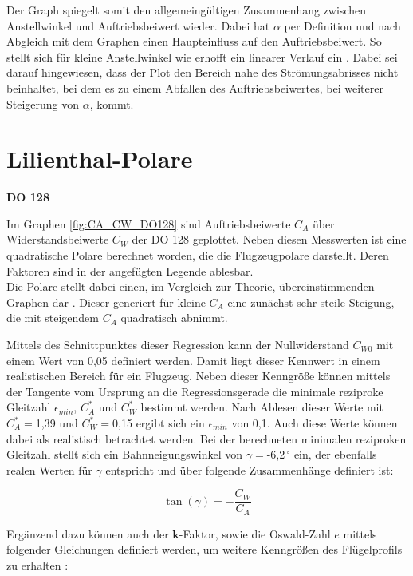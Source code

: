 Der Graph spiegelt somit den allgemeingültigen Zusammenhang zwischen Anstellwinkel und Auftriebsbeiwert wieder. Dabei hat $\alpha$ per Definition und nach Abgleich mit dem Graphen einen Haupteinfluss auf den Auftriebsbeiwert. So stellt sich für kleine Anstellwinkel wie erhofft ein linearer Verlauf ein \cite{Skript}. Dabei sei darauf hingewiesen, dass der Plot den Bereich nahe des Strömungsabrisses nicht beinhaltet, bei dem es zu einem Abfallen des Auftriebsbeiwertes, bei weiterer Steigerung von $\alpha$, kommt.

\section{Lilienthal-Polare}

\textbf{DO 128}

Im Graphen \ref{fig:CA_CW_DO128} sind  Auftriebsbeiwerte $C_A$ über Widerstandsbeiwerte $C_W$ der DO 128 geplottet. Neben diesen Messwerten ist eine quadratische Polare berechnet worden, die die Flugzeugpolare darstellt. Deren Faktoren sind in der angefügten Legende ablesbar. \\ Die Polare stellt dabei einen, im Vergleich zur Theorie, übereinstimmenden Graphen dar \cite{Kurzskript}. Dieser generiert für kleine $C_A$ eine zunächst sehr steile Steigung, die mit steigendem $C_A$ quadratisch abnimmt. 

Mittels des Schnittpunktes dieser Regression kann der Nullwiderstand $C_{W0}$ mit einem Wert von 0,05 definiert werden. Damit liegt dieser Kennwert in einem realistischen Bereich für ein Flugzeug. Neben dieser Kenngröße können mittels der Tangente vom Ursprung an die Regressionsgerade die minimale reziproke Gleitzahl $\epsilon_{min}$, $C_A^*$ und $C_W^*$ bestimmt werden. Nach Ablesen dieser Werte mit $C_A^*=$1,39 und $C_W^*=$0,15 ergibt sich ein $\epsilon_{min}$ von 0,1. Auch diese Werte können dabei als realistisch betrachtet werden. Bei der berechneten minimalen reziproken Gleitzahl stellt sich ein Bahnneigungswinkel von $\gamma=$-6,2$^{\ \circ}$ ein, der ebenfalls realen Werten für $\gamma$ entspricht und über folgende Zusammenhänge definiert ist:

\begin{equation}
\tan\left(\gamma\right)=-\frac{C_W}{C_A}
\end{equation}

Ergänzend dazu können auch der $\textbf{k}$-Faktor, sowie die Oswald-Zahl $e$ mittels folgender Gleichungen definiert werden, um weitere Kenngrößen des Flügelprofils zu erhalten \cite{Skript}:

